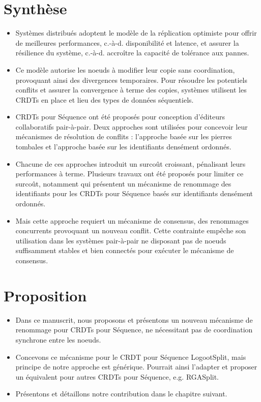 \documentclass[12pt]{thesul}
\newcommand{\eg}{e.g. }
\newcommand{\ie}{c.-à-d. }
\begin{document}
\section{Synthèse}

\begin{itemize}
  \item Systèmes distribués adoptent le modèle de la réplication optimiste pour offrir de meilleures performances, \ie disponibilité et latence, et assurer la résilience du système, \ie accroître la capacité de tolérance aux pannes.
  \item Ce modèle autorise les noeuds à modifier leur copie sans coordination, provoquant ainsi des divergences temporaires.
    Pour résoudre les potentiels conflits et assurer la convergence à terme des copies, systèmes utilisent les \acp{CRDT} en place et lieu des types de données séquentiels.
  \item \acp{CRDT} pour Séquence ont été proposés pour conception d'éditeurs collaboratifs pair-à-pair.
    Deux approches sont utilisées pour concevoir leur mécanismes de résolution de conflits : l'approche basée sur les pierres tombales et l'approche basée sur les identifiants densément ordonnés.
  \item Chacune de ces approches introduit un surcoût croissant, pénalisant leurs performances à terme.
    Plusieurs travaux ont été proposés pour limiter ce surcoût, notamment \cite{letia:hal-01248270, zawirski:hal-01248197} qui présentent un mécanisme de renommage des identifiants pour les \acp{CRDT} pour Séquence basés sur identifiants densément ordonnés.
  \item Mais cette approche requiert un mécanisme de consensus, des renommages concurrents provoquant un nouveau conflit.
    Cette contrainte empêche son utilisation dans les systèmes pair-à-pair ne disposant pas de noeuds suffisamment stables et bien connectés pour exécuter le mécanisme de consensus.
\end{itemize}

\section{Proposition}

\begin{itemize}
  \item Dans ce manuscrit, nous proposons et présentons un nouveau mécanisme de renommage pour \acp{CRDT} pour Séquence, ne nécessitant pas de coordination synchrone entre les noeuds.
  \item Concevons ce mécanisme pour le \ac{CRDT} pour Séquence LogootSplit, mais principe de notre approche est générique.
    Pourrait ainsi l'adapter et proposer un équivalent pour autres \acp{CRDT} pour Séquence, \eg RGASplit.
  \item Présentons et détaillons notre contribution dans le chapitre suivant.
\end{itemize}
\end{document}
